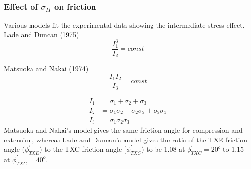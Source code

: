 \documentclass[notes]{beamer}
\begin{document}
\begin{frame}
\frametitle{Effect of $\sigma_{II}$ on friction}
	Various models fit the experimental data showing the intermediate stress effect.
	Lade and Duncan (1975)
	\begin{equation*}
		\frac{I_1^3}{I_3} = const
	\end{equation*}
	
	Matsuoka and Nakai (1974)
	\begin{equation*}
		\frac{I_1 I_2}{I_3} = const
	\end{equation*}
	
	\begin{align*}
		I_1 &= \sigma_1 + \sigma_2 + \sigma_3 \\
		I_2 &= \sigma_1\sigma_2 + \sigma_2 \sigma_3 + \sigma_3 \sigma_1\\
		I_3 &= \sigma_1\sigma_2\sigma_3
	\end{align*}
Matsuoka and Nakai's model gives the same friction angle for compression and extension, whereas Lade and Duncan's model gives the ratio of the TXE friction angle ($\phi_{TXE}^\prime$) to the TXC friction angle ($\phi_{TXC}^\prime$) to be 1.08 at $\phi_{TXC}^\prime = 20^o$ to 1.15 at $\phi_{TXC}^\prime = 40^o$. 
\end{frame}
\end{document}
